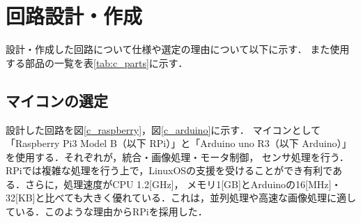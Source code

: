 \documentclass[10pt,a4j]{ujarticle}
\begin{document}
\section{回路設計・作成}
設計・作成した回路について仕様や選定の理由について以下に示す．
また使用する部品の一覧を表\ref{tab:c_parts}に示す．

\subsection{マイコンの選定}
設計した回路を図\ref{c_raspberry}，図\ref{c_arduino}に示す．
マイコンとして「Raspberry Pi3 Model B（以下 RPi）」と「Arduino uno R3（以下 Arduino）」を使用する．それぞれが，統合・画像処理・モータ制御，
センサ処理を行う．RPiでは複雑な処理を行う上で，LinuxOSの支援を受けることができ有利である．さらに，処理速度がCPU 1.2[GHz]，
メモリ1[GB]とArduinoの16[MHz]・32[KB]と比べても大きく優れている．これは，並列処理や高速な画像処理に適している．このような理由からRPiを採用した．
\end{document}
